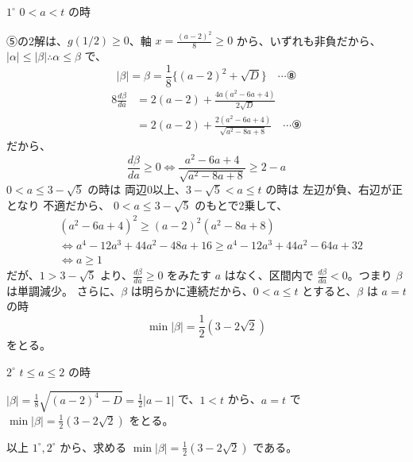 \documentclass[../main.tex]{subfiles}
\begin{document}
$1^\circ$ $0 < a < t$ の時

⑤の2解は、$g(1/2) \ge 0$、軸 $x = \frac{(a-2)^2}{8} \ge 0$ から、いずれも非負だから、$|\alpha| \le |\beta| \therefore \alpha \le \beta$ で、
\[ |\beta| = \beta = \frac{1}{8}\{(a-2)^2 + \sqrt{D}\} \quad \cdots \text{⑧} \]
\begin{align*}
  8\frac{d\beta}{da} &= 2(a-2) + \frac{4a(a^2-6a+4)}{2\sqrt{D}} \\
  &= 2(a-2) + \frac{2(a^2-6a+4)}{\sqrt{a^2-8a+8}} \quad \cdots \text{⑨}
\end{align*}
だから、
\[ \frac{d\beta}{da} \ge 0 \iff \frac{a^2-6a+4}{\sqrt{a^2-8a+8}} \ge 2-a \]
$0 < a \le 3-\sqrt{5}$ の時は 両辺0以上、$3-\sqrt{5} < a \le t$ の時は 左辺が負、右辺が正となり 不適だから、
$0 < a \le 3-\sqrt{5}$ のもとで2乗して、
\begin{align*}
  &(a^2-6a+4)^2 \ge (a-2)^2(a^2-8a+8) \\
  &\iff a^4 - 12a^3 + 44a^2 - 48a + 16 \ge a^4 - 12a^3 + 44a^2 - 64a + 32 \\
  &\iff a \ge 1
\end{align*}
だが、$1 > 3-\sqrt{5}$ より、$\frac{d\beta}{da} \ge 0$ をみたす $a$ はなく、区間内で $\frac{d\beta}{da} < 0$。つまり $\beta$ は単調減少。
さらに、$\beta$ は明らかに連続だから、$0 < a \le t$ とすると、$\beta$ は $a=t$ の時
\[ \min |\beta| = \frac{1}{2}(3-2\sqrt{2}) \]
をとる。

$2^\circ$ $t \le a \le 2$ の時

$|\beta| = \frac{1}{8}\sqrt{(a-2)^4 - D} = \frac{1}{2}|a-1|$ で、$1 < t$ から、$a=t$ で $\min |\beta| = \frac{1}{2}(3-2\sqrt{2})$ をとる。

以上 $1^\circ, 2^\circ$ から、求める $\min |\beta| = \frac{1}{2}(3-2\sqrt{2})$ である。
\end{document}
